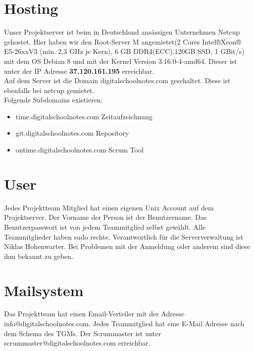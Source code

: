 \documentclass[12pt,a4paper,oneside,ngerman]{scrartcl}
\begin{document}
\justify
\section{Hosting}
Unser Projektserver ist beim in Deutschland ansässigen Unternehmen Netcup\cite{NETCUP:1} gehostet. Hier haben wir den Root-Server M angemietet(2 Cores Intel®Xeon® E5-26xxV3
(min. 2,3 GHz je Kern), 6 GB DDR4(ECC),120GB SSD, 1 GBit/s)\cite{NETCUP:2} mit dem OS Debian 8 und mit der Kernel Version 3.16.0-4-amd64. Dieser ist unter der IP Adresse \textbf{37.120.161.195} erreichbar.\\

Auf dem Server ist die Domain digitalschoolnotes.com geschaltet. Diese ist ebenfalls bei netcup gemietet.\\

Folgende Subdomains existieren:

\begin{itemize}
\item time.digitalschoolnotes.com \hfill Zeitaufzeichnung
\item git.digitalschoolnotes.com \hfill Repository
\item ontime.digitalschoolnotes.com \hfill Scrum Tool
\end{itemize}

\section{User}
Jedes Projektteam Mitglied hat einen eigenen Unix Account auf dem Projektserver. Der Vorname der Person ist der Benutzername. Das Benutzerpasswort ist von jedem Teammitglied selbst gewählt. Alle Teammitglieder haben sudo rechte. Verantwortlich für die Serververwaltung ist Niklas Hohenwarter. Bei Problemen mit der Anmeldung oder anderem sind diese ihm bekannt zu geben.

\section{Mailsystem}
Das Projektteam hat einen Email-Verteiler mit der Adresse info@digitalschoolnotes.com. Jedes Teammitglied hat eine E-Mail Adresse nach dem Schema des TGMs. Der Scrummaster ist unter scrummaster@digitalschoolnotes.com erreichbar.
\end{document}
